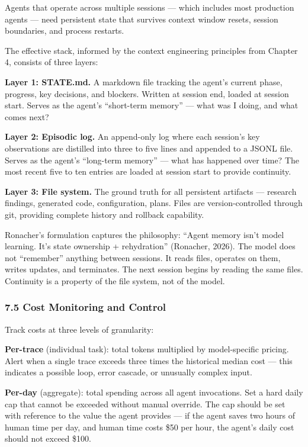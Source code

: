 \documentclass[11pt, a4paper]{article}
\begin{document}
Agents that operate across multiple sessions --- which includes most
production agents --- need persistent state that survives context window
resets, session boundaries, and process restarts.

The effective stack, informed by the context engineering principles from
Chapter 4, consists of three layers:

\textbf{Layer 1: STATE.md.} A markdown file tracking the agent's current
phase, progress, key decisions, and blockers. Written at session end,
loaded at session start. Serves as the agent's ``short-term memory'' ---
what was I doing, and what comes next?

\textbf{Layer 2: Episodic log.} An append-only log where each session's
key observations are distilled into three to five lines and appended to
a JSONL file. Serves as the agent's ``long-term memory'' --- what has
happened over time? The most recent five to ten entries are loaded at
session start to provide continuity.

\textbf{Layer 3: File system.} The ground truth for all persistent
artifacts --- research findings, generated code, configuration, plans.
Files are version-controlled through git, providing complete history and
rollback capability.

Ronacher's formulation captures the philosophy: ``Agent memory isn't
model learning. It's state ownership + rehydration'' (Ronacher, 2026).
The model does not ``remember'' anything between sessions. It reads
files, operates on them, writes updates, and terminates. The next
session begins by reading the same files. Continuity is a property of
the file system, not of the model.

\hypertarget{cost-monitoring-and-control}{%
\subsubsection{7.5 Cost Monitoring and
Control}\label{cost-monitoring-and-control}}

Track costs at three levels of granularity:

\textbf{Per-trace} (individual task): total tokens multiplied by
model-specific pricing. Alert when a single trace exceeds three times
the historical median cost --- this indicates a possible loop, error
cascade, or unusually complex input.

\textbf{Per-day} (aggregate): total spending across all agent
invocations. Set a hard daily cap that cannot be exceeded without manual
override. The cap should be set with reference to the value the agent
provides --- if the agent saves two hours of human time per day, and
human time costs \$50 per hour, the agent's daily cost should not exceed
\$100.
\end{document}
